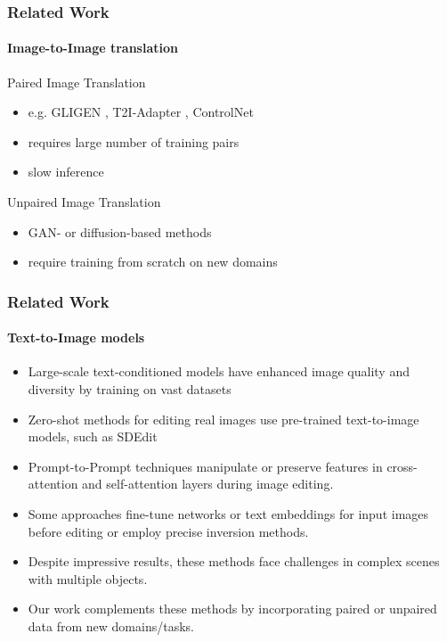 \documentclass[aspectratio=169, lecture, amberg]{OTHAWbeamer}
\begin{document}
\begin{frame}
\frametitle{Related Work}
\framesubtitle{Image-to-Image translation}
Paired Image Translation
\begin{itemize}
    \item e.g. GLIGEN \cite{li2023gligen}, T2I-Adapter \cite{mou2023t2i}, ControlNet \cite{zhang2023adding}
    \item requires large number of training pairs
    \item slow inference
\end{itemize}
Unpaired Image Translation
\begin{itemize}
    \item GAN- or diffusion-based methods \cite{cyclediffusion} \cite{su2022dual} \cite{sasaki2021unitddpm}
    \item require training from scratch on new domains   
\end{itemize}
\end{frame}

\begin{frame}
\frametitle{Related Work}
\framesubtitle{Text-to-Image models}
\begin{itemize}
    \item Large-scale text-conditioned models have enhanced image quality and diversity by training on vast datasets \cite{schuhmann2022laion5b, kakaobrain2022coyo-700m}
    \item Zero-shot methods for editing real images use pre-trained text-to-image models, such as SDEdit \cite{meng2022sdedit}
    \item Prompt-to-Prompt techniques manipulate or preserve features in cross-attention and self-attention layers during image editing.
    \item Some approaches fine-tune networks or text embeddings for input images before editing or employ precise inversion methods.
    \item Despite impressive results, these methods face challenges in complex scenes with multiple objects.
    \item Our work complements these methods by incorporating paired or unpaired data from new domains/tasks.    
\end{itemize}
\end{frame}
\end{document}
